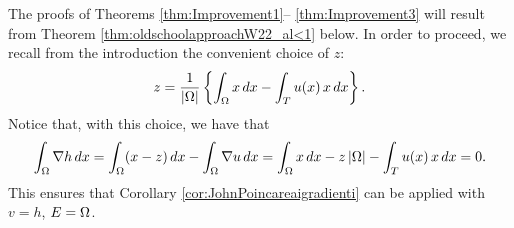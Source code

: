 \documentclass[a4paper,10pt]{amsart}
\numberwithin{equation}{section}
\begin{document}



The proofs of Theorems \ref{thm:Improvement1}-- \ref{thm:Improvement3} will result from 
Theorem \ref{thm:oldschoolapproachW22_al<1} below. In order to proceed, we recall from the introduction the convenient choice of $z$: 
\begin{equation*}
	z = \frac{1}{|\Omega|} \left\{ \int_\Omega x \, dx - \int_T u(x) \, x \, dx  \right\} .
\end{equation*}
Notice that, with this choice, we have that 
$$
\int_\Omega \nabla h \, dx =\int_\Omega (x-z) \, dx- \int_\Omega \nabla u \, dx=  \int_\Omega x \, dx - z\, |\Omega| -\int_T u(x) \, x \, dx = 0 .
$$
This ensures that Corollary \ref{cor:JohnPoincareaigradienti} can be applied with $v=h$, $E=\Omega$.

\end{document}
